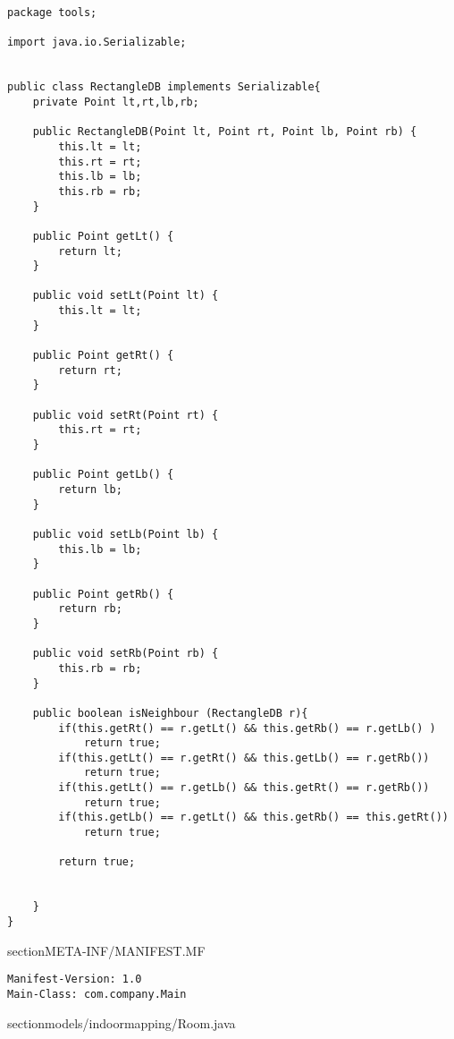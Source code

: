 \documentclass{article}
\begin{document}
\begin{lstlisting}package tools;

import java.io.Serializable;


public class RectangleDB implements Serializable{
    private Point lt,rt,lb,rb;

    public RectangleDB(Point lt, Point rt, Point lb, Point rb) {
        this.lt = lt;
        this.rt = rt;
        this.lb = lb;
        this.rb = rb;
    }

    public Point getLt() {
        return lt;
    }

    public void setLt(Point lt) {
        this.lt = lt;
    }

    public Point getRt() {
        return rt;
    }

    public void setRt(Point rt) {
        this.rt = rt;
    }

    public Point getLb() {
        return lb;
    }

    public void setLb(Point lb) {
        this.lb = lb;
    }

    public Point getRb() {
        return rb;
    }

    public void setRb(Point rb) {
        this.rb = rb;
    }

    public boolean isNeighbour (RectangleDB r){
        if(this.getRt() == r.getLt() && this.getRb() == r.getLb() )
            return true;
        if(this.getLt() == r.getRt() && this.getLb() == r.getRb())
            return true;
        if(this.getLt() == r.getLb() && this.getRt() == r.getRb())
            return true;
        if(this.getLb() == r.getLt() && this.getRb() == this.getRt())
            return true;

        return true;


    }
}
\end{lstlisting}
\newpage
section{META-INF/MANIFEST.MF}
\begin{lstlisting}Manifest-Version: 1.0
Main-Class: com.company.Main

\end{lstlisting}
\newpage
section{models/indoormapping/Room.java}
\end{document}
